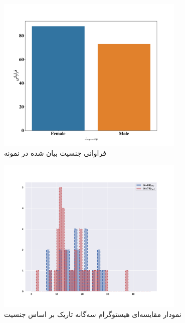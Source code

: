 \begin{figure}[htpb]
    \centering
    \includegraphics[width=0.8\textwidth]{./img/sexualityAgainstPopulation.pdf}
    \caption{فراوانی جنسیت بیان شده در نمونه}
    \label{fig:sexualityAgainstPopulation}
\end{figure}
\begin{figure}[htpb]
    \centering
    \includegraphics[width=0.8\textwidth]{./img/BoxPlotDTRSVOType.png}
    \caption{نمودار مقایسه‌ای هیستوگرام سه‌گانه تاریک بر اساس جنسیت}
    \label{fig:BoxPlotDTRSVOType}
\end{figure}

